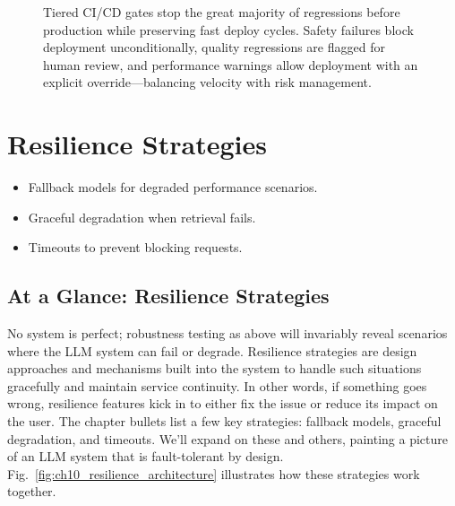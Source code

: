 \begin{figure}[t]
\begin{llmfigbox}
\end{llmfigbox}
\caption{Tiered CI/CD gates stop the great majority of regressions before production while preserving fast deploy cycles. Safety failures block deployment unconditionally, quality regressions are flagged for human review, and performance warnings allow deployment with an explicit override---balancing velocity with risk management.}
\label{fig:ch10_cicd_decision_flow}
\end{figure}

\section{Resilience Strategies}
\label{sec:ch10-resilience-strategies}
\begin{itemize}
    \item Fallback models for degraded performance scenarios.
    \item Graceful degradation when retrieval fails.
    \item Timeouts to prevent blocking requests.
\end{itemize}

\subsection*{At a Glance: Resilience Strategies}
No system is perfect; robustness testing as above will invariably reveal scenarios where the LLM system can fail or degrade. Resilience strategies are design approaches and mechanisms built into the system to handle such situations gracefully and maintain service continuity. In other words, if something goes wrong, resilience features kick in to either fix the issue or reduce its impact on the user. The chapter bullets list a few key strategies: fallback models, graceful degradation, and timeouts. We'll expand on these and others, painting a picture of an LLM system that is fault-tolerant by design.
Fig.~\ref{fig:ch10_resilience_architecture} illustrates how these strategies work together.

